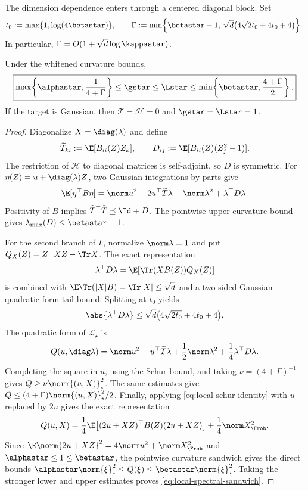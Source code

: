 The dimension dependence enters through a centered diagonal block.  Set
\begin{equation}
  t_0:=\max\{1,\log(4\betastar)\},
  \qquad
  \Gamma:=
  \min\!\left\{
    \betastar-1,\,
    \sqrt d\bigl(4\sqrt{2t_0}+4t_0+4\bigr)
  \right\}.
  \label{eq:local-Gamma}
\end{equation}
In particular,
\(\Gamma=O(1+\sqrt d\log\kappastar)\).

\begin{theorem}
\label{thm:local-spectral-sandwich}
Under the whitened curvature bounds,
\begin{equation}
  \boxed{
  \max\!\left\{\alphastar,\frac1{4+\Gamma}\right\}
  \leq\gstar\leq\Lstar
  \leq
  \min\!\left\{\betastar,\frac{4+\Gamma}{2}\right\}.}
  \label{eq:local-spectral-sandwich}
\end{equation}
If the target is Gaussian, then
\(\mathcal T=\mathcal H=0\) and
\(\gstar=\Lstar=1\).
\end{theorem}

\begin{proof}
Diagonalize \(X=\diag(\lambda)\) and define
\[
  \widetilde T_{ki}:=\E[B_{ii}(Z)Z_k],
  \qquad
  D_{ij}:=\E[B_{ii}(Z)(Z_j^2-1)].
\]
The restriction of \(\mathcal H\) to diagonal matrices is self-adjoint, so
\(D\) is symmetric.  For
\(\eta(Z)=u+\diag(\lambda)Z\), two Gaussian integrations by parts give
\begin{equation}
  \E[\eta^\top B\eta]
  =
  \norm u^2+2u^\top\widetilde T\lambda
  +\norm\lambda^2+\lambda^\top D\lambda.
  \label{eq:local-schur-identity}
\end{equation}
Positivity of \(B\) implies
\(\widetilde T^\top\widetilde T\preceq\Id+D\).
The pointwise upper curvature bound gives
\(\lambda_{\max}(D)\leq\betastar-1\).

For the second branch of \(\Gamma\), normalize \(\norm\lambda=1\) and put
\(Q_X(Z)=Z^\top XZ-\Tr X\).  The exact representation
\[
  \lambda^\top D\lambda
  =\E\!\left[\Tr(XB(Z))Q_X(Z)\right]
\]
is combined with
\(\E\Tr(|X|B)=\Tr|X|\leq\sqrt d\) and a two-sided Gaussian
quadratic-form tail bound.  Splitting at \(t_0\) yields
\[
  \abs{\lambda^\top D\lambda}
  \leq
  \sqrt d\bigl(4\sqrt{2t_0}+4t_0+4\bigr).
\]
The quadratic form of \(\mathscr L_\star\) is
\[
  Q(u,\diag\lambda)
  =
  \norm u^2+u^\top\widetilde T\lambda
  +\frac12\norm\lambda^2+\frac14\lambda^\top D\lambda.
\]
Completing the square in \(u\), using the Schur bound, and taking
\(\nu=(4+\Gamma)^{-1}\) gives
\(Q\geq\nu\norm{(u,X)}_\star^2\).
The same estimates give
\(Q\leq(4+\Gamma)\norm{(u,X)}_\star^2/2\).
Finally, applying \eqref{eq:local-schur-identity} with \(u\) replaced by
\(2u\) gives the exact representation
\[
  Q(u,X)
  =\frac14\E\!\left[(2u+XZ)^\top B(Z)(2u+XZ)\right]
   +\frac14\norm X_{\Frob}^2.
\]
Since \(\E\norm{2u+XZ}^2=4\norm u^2+\norm X_{\Frob}^2\) and
\(\alphastar\leq1\leq\betastar\), the pointwise curvature sandwich gives
the direct bounds
\(\alphastar\norm{\xi}_\star^2\leq Q(\xi)
\leq\betastar\norm{\xi}_\star^2\).
Taking the stronger lower and upper estimates proves
\eqref{eq:local-spectral-sandwich}.
\end{proof}

